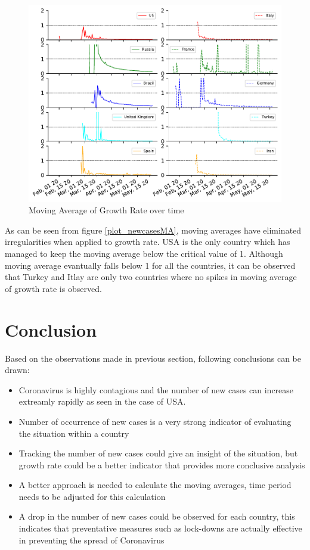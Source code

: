 \documentclass[12pt, twosided]{report}  %
\begin{document}
\begin{figure}[H]
	\centering
	\includegraphics[width=0.5\linewidth]{./images/plot-7.pdf}
	\caption{Moving Average of Growth Rate over time}
	\label{plot_growthrateMA}
\end{figure}    

As can be seen from figure \ref{plot_newcasesMA}, moving averages have eliminated irregularities when applied to growth rate. USA is the only country which has managed to keep the moving average below the critical value of 1. Although moving average evantually falls below 1 for all the countries, it can be observed that Turkey and Itlay are only two countries where no spikes in moving average of growth rate is observed.

\section{Conclusion}

Based on the observations made in previous section, following conclusions can be drawn:
\begin{itemize}
	\item Coronavirus is highly contagious and the number of new cases can increase extreamly rapidly as seen in the case of USA.
	\item Number of occurrence of new cases is a very strong indicator of evaluating the situation within a country
	\item Tracking the number of new cases could give an insight of the situation, but growth rate could be a better indicator that provides more conclusive analysis
	\item A better approach is needed to calculate the moving averages, time period needs to be adjusted for this calculation
	\item  A drop in the number of new cases could be observed for each country, this indicates that preventative measures such as lock-downs are actually effective in preventing the spread of Coronavirus  
\end{itemize}  



\end{document}

